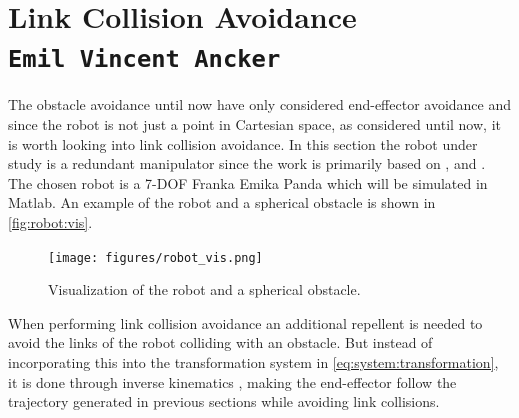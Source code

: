 \documentclass[../main.tex]{subfiles}
\begin{document}
\section{Link Collision Avoidance  \\ \normalfont\normalsize\texttt{Emil Vincent Ancker}}
\label{sec:linkcollision}
The obstacle avoidance until now have only considered end-effector avoidance and since the robot is not just a point in Cartesian space, as considered until now, it is worth looking into link collision avoidance. In this section the robot under study is a redundant manipulator since the work is primarily based on \cite{maciejewski_obstacle_1985}, \cite{dae-hyung_park_movement_2008} and \cite{buss_introduction_nodate}. The chosen robot is a 7-DOF Franka Emika Panda which will be simulated in Matlab. An example of the robot and a spherical obstacle is shown in \autoref{fig:robot:vis}.
\begin{figure}[H]
    \centering
         \texttt{[image: figures/robot\_vis.png]}
     \caption{Visualization of the robot and a spherical obstacle.}
     \label{fig:robot:vis}
\end{figure}

When performing link collision avoidance an additional repellent is needed to avoid the links of the robot colliding with an obstacle. But instead of incorporating this into the transformation system in \autoref{eq:system:transformation}, it is done through inverse kinematics \cite{dae-hyung_park_movement_2008}, making the end-effector follow the trajectory generated in previous sections while avoiding link collisions.\\
\end{document}
